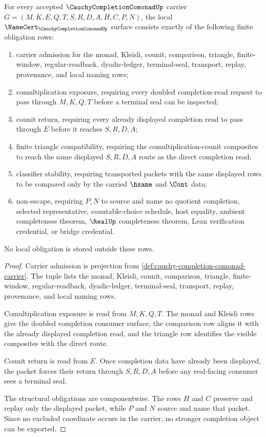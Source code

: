 \begin{theorem}
\label{thm:cauchy-completion-comonad-namecert-obligations}
For every accepted $\CauchyCompletionComonadUp$ carrier $G=(M,K,E,Q,T,S,R,D,A,H,C,P,N)$, the local $\NameCert_{\CauchyCompletionComonadUp}$ surface consists exactly of the following finite obligation rows:
\begin{enumerate}
\item carrier admission for the monad, Kleisli, counit, comparison, triangle, finite-window, regular-readback, dyadic-ledger, terminal-seal, transport, replay, provenance, and local naming rows;
\item comultiplication exposure, requiring every doubled completion-read request to pass through $M,K,Q,T$ before a terminal seal can be inspected;
\item counit return, requiring every already displayed completion read to pass through $E$ before it reaches $S,R,D,A$;
\item finite triangle compatibility, requiring the comultiplication-counit composites to reach the same displayed $S,R,D,A$ route as the direct completion read;
\item classifier stability, requiring transported packets with the same displayed rows to be compared only by the carried $\hsame$ and $\Cont$ data;
\item non-escape, requiring $P,N$ to source and name no quotient completion, selected representative, countable-choice schedule, host equality, ambient completeness theorem, $\RealUp$ completeness theorem, Lean verification credential, or bridge credential.
\end{enumerate}
No local obligation is stored outside these rows.
\end{theorem}
\begin{proof}
Carrier admission is projection from \autoref{def:cauchy-completion-comonad-carrier}. The tuple lists the monad, Kleisli, counit, comparison, triangle, finite-window, regular-readback, dyadic-ledger, terminal-seal, transport, replay, provenance, and local naming rows.

Comultiplication exposure is read from $M,K,Q,T$. The monad and Kleisli rows give the doubled completion consumer surface, the comparison row aligns it with the already displayed completion read, and the triangle row identifies the visible composites with the direct route.

Counit return is read from $E$. Once completion data have already been displayed, the packet forces their return through $S,R,D,A$ before any real-facing consumer sees a terminal seal.

The structural obligations are componentwise. The rows $H$ and $C$ preserve and replay only the displayed packet, while $P$ and $N$ source and name that packet. Since no excluded coordinate occurs in the carrier, no stronger completion object can be exported.
\end{proof}

